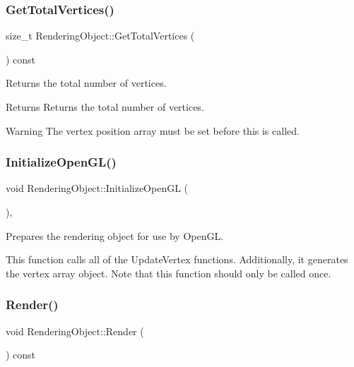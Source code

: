 \subsubsection{\texorpdfstring{Get\+Total\+Vertices()}{GetTotalVertices()}}
{\footnotesize\ttfamily size\+\_\+t Rendering\+Object\+::\+Get\+Total\+Vertices (\begin{DoxyParamCaption}{ }\end{DoxyParamCaption}) const\hspace{0.3cm}{\ttfamily [inline]}}



Returns the total number of vertices.

\begin{DoxyReturn}{Returns}
Returns the total number of vertices.
\end{DoxyReturn}
\begin{DoxyWarning}{Warning}
The vertex position array must be set before this is called.
\end{DoxyWarning}
\hypertarget{class_rendering_object_a77c78d1b42ea2ebfdbf994b6b91ce805}{}\label{class_rendering_object_a77c78d1b42ea2ebfdbf994b6b91ce805}
\subsubsection{\texorpdfstring{Initialize\+Open\+G\+L()}{InitializeOpenGL()}}
{\footnotesize\ttfamily void Rendering\+Object\+::\+Initialize\+Open\+GL (\begin{DoxyParamCaption}{ }\end{DoxyParamCaption})\hspace{0.3cm}{\ttfamily [protected]}, {\ttfamily [virtual]}}



Prepares the rendering object for use by Open\+GL.

This function calls all of the Update\+Vertex functions. Additionally, it generates the vertex array object. Note that this function should only be called once. \hypertarget{class_rendering_object_aee6affd69495adc61bae0e71433d353a}{}\label{class_rendering_object_aee6affd69495adc61bae0e71433d353a}
\subsubsection{\texorpdfstring{Render()}{Render()}}
{\footnotesize\ttfamily void Rendering\+Object\+::\+Render (\begin{DoxyParamCaption}{ }\end{DoxyParamCaption}) const\hspace{0.3cm}{\ttfamily [virtual]}}



